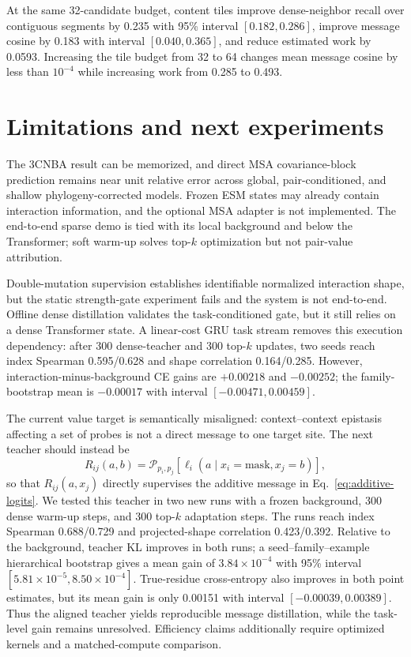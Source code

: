 \documentclass[10pt]{article}
\begin{document}
At the same 32-candidate budget, content tiles improve dense-neighbor recall over contiguous
segments by 0.235 with 95\% interval $[0.182,0.286]$, improve message cosine by 0.183 with
interval $[0.040,0.365]$, and reduce estimated work by 0.0593.  Increasing the tile budget from
32 to 64 changes mean message cosine by less than $10^{-4}$ while increasing work from 0.285
to 0.493.

\small
\section{Limitations and next experiments}

The 3CNBA result can be memorized, and direct MSA covariance-block prediction remains near
unit relative error across global, pair-conditioned, and shallow phylogeny-corrected models.
Frozen ESM states may already contain interaction information, and the optional MSA adapter is
not implemented.  The end-to-end sparse demo is tied with its local background and below the
Transformer; soft warm-up solves top-$k$ optimization but not pair-value attribution.

Double-mutation supervision establishes identifiable normalized interaction shape, but the
static strength-gate experiment fails and the system is not end-to-end.  Offline dense
distillation validates the task-conditioned gate, but it still relies on a dense Transformer state.
A linear-cost GRU task stream removes this execution dependency: after 300 dense-teacher and
300 top-$k$ updates, two seeds reach index Spearman 0.595/0.628 and shape correlation
0.164/0.285.  However, interaction-minus-background CE gains are $+0.00218$ and
$-0.00252$; the family-bootstrap mean is $-0.00017$ with interval
$[-0.00471,0.00459]$.

The current value target is semantically misaligned: context--context epistasis affecting a set
of probes is not a direct message to one target site.  The next teacher should instead be
\begin{equation}
R_{ij}(a,b)=\mathcal P_{p_i,p_j}
\left[\ell_i(a\mid x_i=\mathrm{mask},x_j=b)\right],
\label{eq:conditional-response}
\end{equation}
so that $R_{ij}(a,x_j)$ directly supervises the additive message in
Eq.~\ref{eq:additive-logits}.  We tested this teacher in two new runs with a frozen background,
300 dense warm-up steps, and 300 top-$k$ adaptation steps.  The runs reach index Spearman
0.688/0.729 and projected-shape correlation 0.423/0.392.  Relative to the background, teacher
KL improves in both runs; a seed--family--example hierarchical bootstrap gives a mean gain of
$3.84\times10^{-4}$ with 95\% interval $[5.81\times10^{-5},8.50\times10^{-4}]$.
True-residue cross-entropy also improves in both point estimates, but its mean gain is only
0.00151 with interval $[-0.00039,0.00389]$.  Thus the aligned teacher yields reproducible
message distillation, while the task-level gain remains unresolved.  Efficiency claims
additionally require optimized kernels and a matched-compute comparison.
\end{document}
